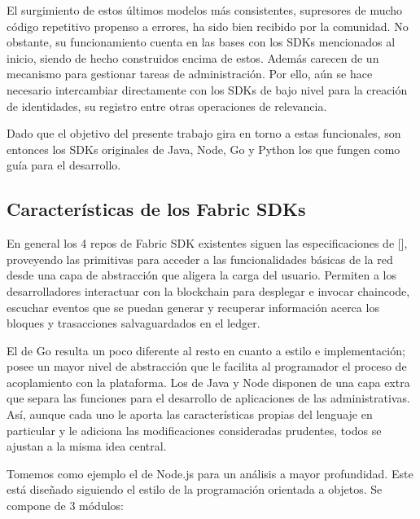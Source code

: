 El surgimiento de estos \'ultimos modelos m\'as consistentes, supresores de mucho c\'odigo repetitivo propenso a errores, ha sido bien recibido por la comunidad. No obstante, su funcionamiento cuenta en las bases con los SDKs mencionados al inicio, siendo de hecho construidos encima de estos. Adem\'as carecen de un mecanismo para gestionar tareas de administraci\'on. Por ello, a\'un se hace necesario intercambiar directamente con los SDKs de bajo nivel para la creaci\'on de identidades, su registro entre otras operaciones de relevancia.

Dado que el objetivo del presente trabajo gira en torno a estas funcionales, son entonces los SDKs originales de Java, Node, Go y Python los que fungen como gu\'ia para el desarrollo.

\subsection{Caracter\'isticas de los Fabric SDKs}

En general los 4 repos de Fabric SDK existentes siguen las especificaciones de [\cite{fabricsdkspec}], proveyendo las primitivas para acceder a las funcionalidades b\'asicas de la red desde una capa de abstracci\'on que aligera la carga del usuario. Permiten a los desarrolladores interactuar con la blockchain para desplegar e invocar chaincode, escuchar eventos que se puedan generar y recuperar informaci\'on acerca los bloques y trasacciones salvaguardados en el ledger. 

El de Go resulta un poco diferente al resto en cuanto a estilo e implementaci\'on; posee un mayor nivel de abstracci\'on que le facilita al programador el proceso de acoplamiento con la plataforma. Los de Java y Node disponen de una capa extra que separa las funciones para el desarrollo de aplicaciones de las administrativas. As\'i, aunque cada uno le aporta las caracter\'isticas propias del lenguaje en particular y le adiciona las modificaciones consideradas prudentes, todos se ajustan a la misma idea central.


Tomemos como ejemplo el de Node.js para un an\'alisis a mayor profundidad. Este est\'a dise\~nado siguiendo el estilo de la programaci\'on orientada a objetos. Se compone de 3 m\'odulos:

